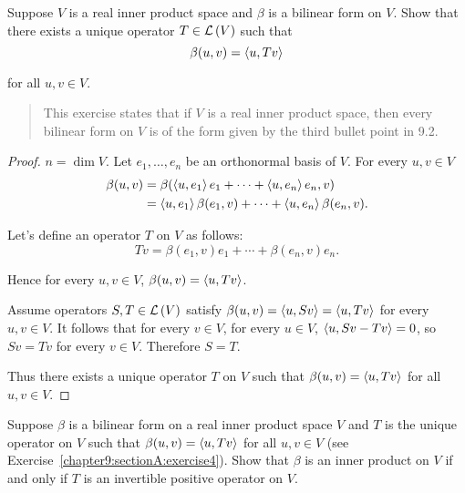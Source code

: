 \begin{exercise}\label{chapter9:sectionA:exercise4}
    Suppose $V$ is a real inner product space and $\beta$ is a bilinear form on $V$. Show that there exists a unique operator $T\in\mathcal{L}\left({V}\right)$ such that
    \[
        \beta(u, v) = \left\langle{u, Tv}\right\rangle
    \]

    for all $u, v\in V$.
\end{exercise}

\begin{quote}
    This exercise states that if $V$ is a real inner product space, then every bilinear form on $V$ is of the form given by the third bullet point in 9.2.
\end{quote}

\begin{proof}
    $n = \dim V$. Let $e_{1}, \ldots, e_{n}$ be an orthonormal basis of $V$. For every $u, v\in V$
    \begin{align*}
        \beta(u, v) & = \beta(\left\langle{u,e_{1}}\right\rangle e_{1} + \cdots + \left\langle{u,e_{n}}\right\rangle e_{n}, v)            \\
                    & = \left\langle{u,e_{1}}\right\rangle\beta(e_{1}, v) + \cdots + \left\langle{u,e_{n}}\right\rangle\beta(e_{n}, v).
    \end{align*}

    Let's define an operator $T$ on $V$ as follows:
    \[
        Tv = \beta(e_{1}, v)e_{1} + \cdots + \beta(e_{n}, v)e_{n}.
    \]

    Hence for every $u, v\in V$, $\beta(u, v) = \left\langle{u, Tv}\right\rangle$.

    Assume operators $S, T\in\mathcal{L}\left({V}\right)$ satisfy $\beta(u, v) = \left\langle{u, Sv}\right\rangle = \left\langle{u, Tv}\right\rangle$ for every $u, v\in V$. It follows that for every $v\in V$, for every $u\in V$, $\left\langle{u, Sv - Tv}\right\rangle = 0$, so $Sv = Tv$ for every $v\in V$. Therefore $S = T$.

    Thus there exists a unique operator $T$ on $V$ such that $\beta(u, v) = \left\langle{u, Tv}\right\rangle$ for all $u, v\in V$.
\end{proof}
\newpage

\begin{exercise}\label{chapter9:sectionA:exercise5}
    Suppose $\beta$ is a bilinear form on a real inner product space $V$ and $T$ is the unique operator on $V$ such that $\beta(u, v) = \left\langle{u, Tv}\right\rangle$ for all $u, v \in V$ (see Exercise~\ref{chapter9:sectionA:exercise4}). Show that $\beta$ is an inner product on $V$ if and only if $T$ is an invertible positive operator on $V$.
\end{exercise}

